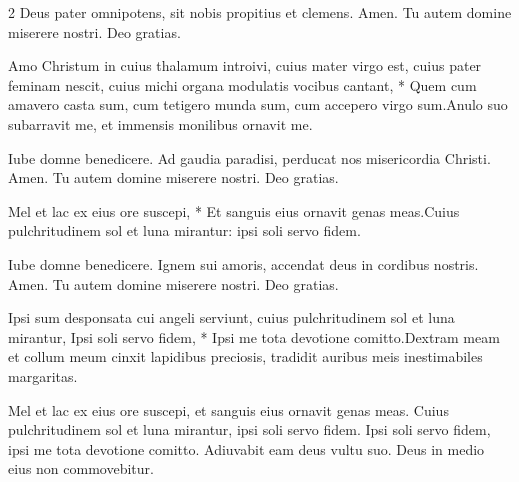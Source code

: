 \begin{multicols}{2}
\newline {} Deus pater omnipotens, sit nobis propitius et clemens. \R Amen.
\newline {} Tu autem domine miserere nostri. \R Deo gratias.
\begin{responsory}
{Amo Christum in cuius thalamum introivi, cuius mater virgo est, cuius pater feminam nescit, cuius michi organa modulatis vocibus cantant, * Quem cum amavero casta sum, cum tetigero munda sum, cum accepero virgo sum.}{Anulo suo subarravit me, et immensis monilibus ornavit me.}
\end{responsory}%
\newline {} Iube domne benedicere.
\newline {} Ad gaudia paradisi, perducat nos misericordia Christi. \R Amen.
\newline {} Tu autem domine miserere nostri. \R Deo gratias.
\begin{responsory}
{Mel et lac ex eius ore suscepi, * Et sanguis eius ornavit genas meas.}{Cuius pulchritudinem sol et luna mirantur: ipsi soli servo fidem.}
\end{responsory}%
\newline {} Iube domne benedicere.
\newline {} Ignem sui amoris, accendat deus in cordibus nostris. \R Amen.
\newline {} Tu autem domine miserere nostri. \R Deo gratias.
\begin{responsory-doxology}
{Ipsi sum desponsata cui angeli serviunt, cuius pulchritudinem sol et luna mirantur, Ipsi soli servo fidem, * Ipsi me tota devotione comitto.}{Dextram meam et collum meum cinxit lapidibus preciosis, tradidit auribus meis inestimabiles margaritas.}
\end{responsory-doxology}%
\newline {}
\newline {} Mel et lac ex eius ore suscepi, et sanguis eius ornavit genas meas.
\newline {} Cuius pulchritudinem sol et luna mirantur, ipsi soli servo fidem.
\newline {} Ipsi soli servo fidem, ipsi me tota devotione comitto.
\newline \V Adiuvabit eam deus vultu suo. \R Deus in medio eius non commovebitur. 

\end{multicols}
